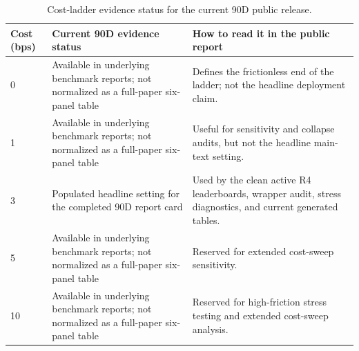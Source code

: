 \begin{table}[t]
\centering
\caption{Cost-ladder evidence status for the current 90D public release.}
\label{tab:table_11_cost_status}
\begin{tabular}{lll}
\toprule
Cost (bps) & Current 90D evidence status & How to read it in the public report \\
\midrule
0 & Available in underlying benchmark reports; not normalized as a full-paper six-panel table & Defines the frictionless end of the ladder; not the headline deployment claim. \\
1 & Available in underlying benchmark reports; not normalized as a full-paper six-panel table & Useful for sensitivity and collapse audits, but not the headline main-text setting. \\
3 & Populated headline setting for the completed 90D report card & Used by the clean active R4 leaderboards, wrapper audit, stress diagnostics, and current generated tables. \\
5 & Available in underlying benchmark reports; not normalized as a full-paper six-panel table & Reserved for extended cost-sweep sensitivity. \\
10 & Available in underlying benchmark reports; not normalized as a full-paper six-panel table & Reserved for high-friction stress testing and extended cost-sweep analysis. \\
\bottomrule
\end{tabular}
\end{table}
